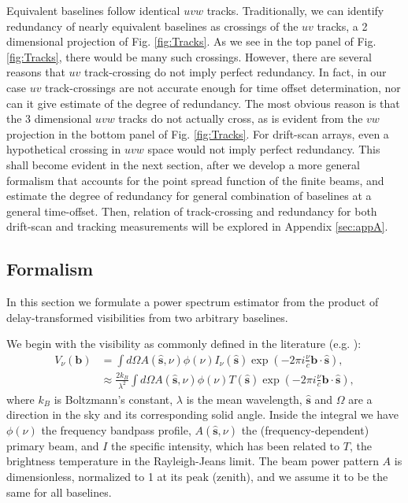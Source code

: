 \documentclass[twocolumn,apj,numberedappendix]{emulateapj}
\renewcommand\[{\begin{equation}}
\renewcommand\]{\end{equation}}
\begin{document}
Equivalent baselines follow identical $uvw$ tracks. Traditionally, we can identify
redundancy of nearly equivalent baselines as crossings
of the $uv$ tracks, a 2 dimensional projection of Fig. \ref{fig:Tracks}. As we see in the top panel of Fig. \ref{fig:Tracks}, there would be many such crossings. However, there are several reasons that $uv$ track-crossing do not imply perfect redundancy. In fact, in our case $uv$ track-crossings are
not accurate enough for time offset determination, nor can it give estimate of the degree of redundancy.  The most obvious reason is that the 3 dimensional $uvw$ tracks do not actually cross, as is evident from the $vw$ projection in the bottom panel of Fig. \ref{fig:Tracks}. For drift-scan arrays, even a hypothetical crossing in $uvw$ space would not imply perfect redundancy. This shall become evident in the next section, after we develop a more general formalism that accounts for the point spread function of the finite beams, and estimate the degree of redundancy for general combination of baselines at a general time-offset. Then, relation of track-crossing and redundancy for both drift-scan and tracking measurements will be explored in Appendix \ref{sec:appA}. 



\subsection{Formalism \label{sec:formalism}}
\label{sec:formalism}
In this section we formulate a power spectrum estimator from
the product of delay-transformed visibilities from two arbitrary baselines. 

We begin with the visibility as commonly defined in the literature (e.g.
\citealt{TMS, first-paper}): 
\begin{equation}
\begin{aligned}V_{\nu}(\boldsymbol{b}) & =\int d\Omega A(\hat{\boldsymbol{s}},\nu)\phi(\nu)I_{\nu}(\hat{\boldsymbol{s}})\exp\left(-2\pi i\frac{\nu}{c}\boldsymbol{b}\cdot\hat{\boldsymbol{s}}\right),\\
 & \approx\frac{2k_{B}}{\lambda^{2}}\int d\Omega A(\hat{\boldsymbol{s}},\nu)\phi(\nu)T(\hat{\boldsymbol{s}})\exp\left(-2\pi i\frac{\nu}{c}\boldsymbol{b}\cdot\hat{\boldsymbol{s}}\right),
\end{aligned}
\label{eq:Vis1}
\end{equation}
where $k_B$ is Boltzmann's constant, $\lambda$ is the mean wavelength, $\hat{\boldsymbol{s}}$ and $\Omega$ are a direction in the
sky and its corresponding solid angle. Inside the integral we have $\phi(\nu)$ the frequency bandpass profile, $A(\hat{\boldsymbol{s}},\nu)$ the (frequency-dependent) primary beam, and $I$ the specific intensity, which has been
related to $T$, the brightness temperature in the Rayleigh-Jeans
limit. The beam power pattern $A$ is dimensionless,
normalized to 1 at its peak (zenith), and we assume it to be the same
for all baselines. %
\end{document}
